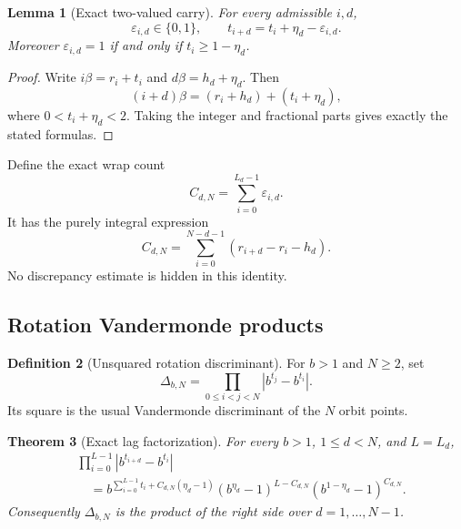 \documentclass[11pt,oneside]{article}
\newtheorem{theorem}{Theorem}[section]
\newtheorem{lemma}[theorem]{Lemma}
\theoremstyle{definition}
\newtheorem{definition}[theorem]{Definition}
\theoremstyle{remark}
\begin{document}
\begin{lemma}[Exact two-valued carry]
\label{lem:carry}
For every admissible $i,d$,
\[
 \varepsilon_{i,d}\in\{0,1\},\qquad
 t_{i+d}=t_i+\eta_d-\varepsilon_{i,d}.
\]
Moreover $\varepsilon_{i,d}=1$ if and only if $t_i\ge1-\eta_d$.
\end{lemma}

\begin{proof}
Write $i\beta=r_i+t_i$ and $d\beta=h_d+\eta_d$.  Then
\[
 (i+d)\beta=(r_i+h_d)+(t_i+\eta_d),
\]
where $0<t_i+\eta_d<2$.  Taking the integer and fractional parts gives exactly the stated
formulas.
\end{proof}

Define the exact wrap count
\begin{equation}
 C_{d,N}=\sum_{i=0}^{L_d-1}\varepsilon_{i,d}.
 \label{eq:wrap-count}
\end{equation}
It has the purely integral expression
\begin{equation}
 C_{d,N}=
 \sum_{i=0}^{N-d-1}(r_{i+d}-r_i-h_d).
 \label{eq:wrap-floor-sum}
\end{equation}
No discrepancy estimate is hidden in this identity.

\subsection{Rotation Vandermonde products}

\begin{definition}[Unsquared rotation discriminant]
For $b>1$ and $N\ge2$, set
\begin{equation}
 \Delta_{b,N}=\prod_{0\le i<j<N}|b^{t_j}-b^{t_i}|.
 \label{eq:Delta}
\end{equation}
Its square is the usual Vandermonde discriminant of the $N$ orbit points.
\end{definition}

\begin{theorem}[Exact lag factorization]
\label{thm:lag-factorization}
For every $b>1$, $1\le d<N$, and $L=L_d$,
\begin{align}
 &\prod_{i=0}^{L-1}|b^{t_{i+d}}-b^{t_i}| \\
 &\quad =
 b^{\displaystyle\sum_{i=0}^{L-1}t_i+C_{d,N}(\eta_d-1)}
 (b^{\eta_d}-1)^{L-C_{d,N}}
 (b^{1-\eta_d}-1)^{C_{d,N}}.
 \label{eq:lag-factorization}
\end{align}
Consequently $\Delta_{b,N}$ is the product of the right side over $d=1,\ldots,N-1$.
\end{theorem}
\end{document}
